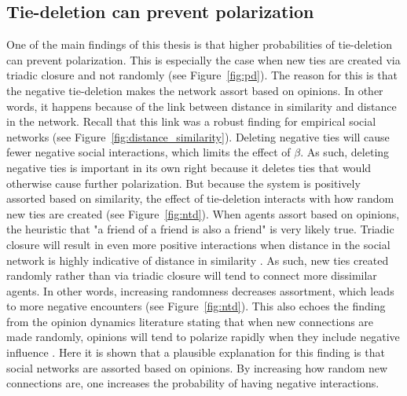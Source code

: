 \documentclass[11pt]{article}
\begin{document}
\subsection{Tie-deletion can prevent polarization}
One of the main findings of this thesis is that higher probabilities of tie-deletion can prevent polarization. This is especially the case when new ties are created via triadic closure and not randomly (see Figure~\ref{fig:pd}). The reason for this is that the negative tie-deletion makes the network assort based on opinions. In other words, it happens because of the link between distance in similarity and distance in the network. Recall that this link was a robust finding for empirical social networks (see Figure~\ref{fig:distance_similarity}). Deleting negative ties will cause fewer negative social interactions, which limits the effect of $\beta$. 
As such, deleting negative ties is important in its own right because it deletes ties that would otherwise cause further polarization. But because the system is positively assorted based on similarity, the effect of tie-deletion interacts with how random new ties are created (see Figure~\ref{fig:ntd}). When agents assort based on opinions, the heuristic that "a friend of a friend is also a friend" is very likely true. Triadic closure will result in even more positive interactions when distance in the social network is highly indicative of distance in similarity \cite{kossinets_origins_2009}. As such, new ties created randomly rather than via triadic closure will tend to connect more dissimilar agents. In other words, increasing randomness decreases assortment, which leads to more negative encounters (see Figure~\ref{fig:ntd}). This also echoes the finding from the opinion dynamics literature stating that when new connections are made randomly, opinions will tend to polarize rapidly when they include negative influence \cite{flache_why_2006,flache_small_2011,turner_paths_2018}. Here it is shown that a plausible explanation for this finding is that social networks are assorted based on opinions. By increasing how random new connections are, one increases the probability of having negative interactions. 
\end{document}
